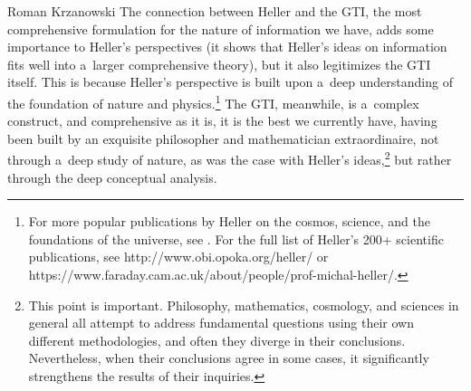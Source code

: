 \begin{artengenv}{Roman Krzanowski}
The connection between Heller and the GTI, the most comprehensive formulation for the nature of information we have, adds some importance to Heller's perspectives (it shows that Heller's ideas on information fits well into a~larger comprehensive theory), but it also legitimizes the GTI itself. This is because Heller's perspective is built upon a~deep understanding of the foundation of nature and physics.\footnote{For more popular publications by Heller on the cosmos, science, and the foundations of the universe, see 
\parencites[][]{heller_ostateczne_2008}[][]{heller_podgladanie_2008}[][]{heller_philosophy_2011}[][]{heller_matematyka_2012}[][]{heller_filozofia_2013}[][]{heller_logos_2013}[][]{heller_przestrzenie_2017}[][]{heller_jedna_2020}. %
 For the full list of Heller's 200+ scientific publications, see http://www.obi.opoka.org/heller/ or https://www.faraday.cam.ac.uk/about/people/prof-michal-heller/.} The GTI, meanwhile, is a~complex construct, and comprehensive as it is, it is the best we currently have, having been built by an exquisite philosopher and mathematician extraordinaire, not through a~deep study of nature, as was the case with Heller's ideas,\footnote{This point is important. Philosophy, mathematics, cosmology, and sciences in general all attempt to address fundamental questions using their own different methodologies, and often they diverge in their conclusions. Nevertheless, when their conclusions agree in some cases, it significantly strengthens the results of their inquiries.} but rather through the deep conceptual analysis.




\end{artengenv}
